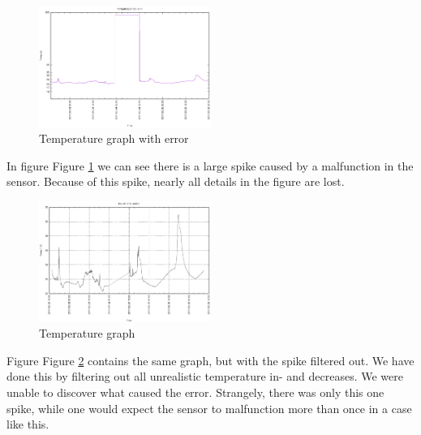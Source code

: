 \documentclass{below-ext}
\begin{document}

\begin{figure}
\centering
\label{fig:temperror}
\includegraphics[width=0.5\textwidth]{temperror}
\caption{Temperature graph with error}
\end{figure}

In figure Figure \ref{fig:temperror} we can see there is a large spike caused by a malfunction in the sensor. Because of this spike, nearly all details in the figure are lost.

\begin{figure}
\centering
\label{fig:temp}
\includegraphics[width=0.5\textwidth]{graph}
\caption{Temperature graph}
\end{figure}

Figure Figure \ref{fig:temp} contains the same graph, but with the spike filtered out. We have done this by filtering out all unrealistic temperature in- and decreases. We were unable to discover what caused the error. Strangely, there was only this one spike, while one would expect the sensor to malfunction more than once in a case like this.
\end{document}
